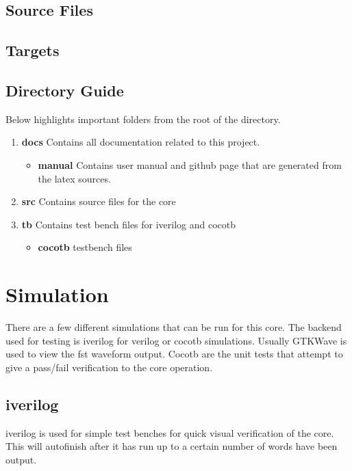 \subsection{Source Files}



\subsection{Targets}



\subsection{Directory Guide}

\par
Below highlights important folders from the root of the directory.

\begin{enumerate}
  \item \textbf{docs} Contains all documentation related to this project.
    \begin{itemize}
      \item \textbf{manual} Contains user manual and github page that are generated from the latex sources.
    \end{itemize}
  \item \textbf{src} Contains source files for the core
  \item \textbf{tb} Contains test bench files for iverilog and cocotb
    \begin{itemize}
      \item \textbf{cocotb} testbench files
    \end{itemize}
\end{enumerate}

\newpage

\section{Simulation}
\par
There are a few different simulations that can be run for this core. The backend used for testing is iverilog for verilog or cocotb simulations. Usually GTKWave is used to view the fst waveform output. Cocotb are the unit tests that attempt to give a pass/fail verification to the core operation.

\subsection{iverilog}
\par
iverilog is used for simple test benches for quick visual verification of the core. This will autofinish after it has
run up to a certain number of words have been output.

